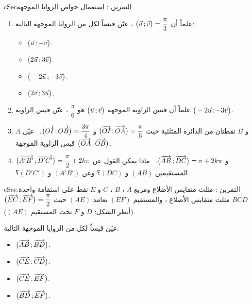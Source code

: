 \documentclass[12pt,a4paper]{article}
\newenvironment{BOX}[2]{\begin{otherlanguage}{english}\begin{arbox}{#1}{#2}}{\end{arbox}\end{otherlanguage}}
\newcounter{exo}
\newenvironment{tamrin}[1]{\stepcounter{exo}\begin{BOX}{cSec}{التمرين \theexo: #1}}{\end{BOX}}
\newenvironment{LTR}{\begin{otherlanguage}{english}}{\end{otherlanguage}}
\newenvironment{sq}{\begin{itemize}[leftmargin=2.4em,itemsep=3pt]}{\end{itemize}}
\newcommand{\qa}{\item[(أ)]}\newcommand{\qb}{\item[(ب)]}\newcommand{\qc}{\item[(جـ)]}\newcommand{\qd}{\item[(د)]}\newcommand{\qe}{\item[(هـ)]}
\begin{document}
\begin{tamrin}{استعمال خواص الزوايا الموجهة}
\begin{enumerate}
\item علماً أن $\big(\vec u\,;\vec v\big)=\dfrac{\pi}{3}$ ، عيّن قيساً لكل من الزوايا الموجهة التالية:
\begin{sq}
\qa $\big(\vec u\,;-\vec v\big)$.
\qb $\big(2\vec u\,;3\vec v\big)$.
\qc $\big(-2\vec u\,;-3\vec v\big)$.
\qd $\big(2\vec v\,;3\vec u\big)$.
\end{sq}
\item علماً أن قيس الزاوية الموجهة $\big(\vec u\,;\vec v\big)$ هو $\dfrac{\pi}{6}$ ، عيّن قيس الزاوية $\big(-2\vec u\,;-3\vec v\big)$.
\item $A$ و $B$ نقطتان من الدائرة المثلثية حيث $\big(\overrightarrow{OI}\,;\overrightarrow{OA}\big)=\dfrac{\pi}{6}$ و $\big(\overrightarrow{OI}\,;\overrightarrow{OB}\big)=\dfrac{3\pi}{4}$. \ عيّن قيس الزاوية الموجهة $\big(\overrightarrow{OA}\,;\overrightarrow{OB}\big)$.
\item $\big(\overrightarrow{A'B'}\,;\overrightarrow{D'C'}\big)=\dfrac{\pi}{2}+2k\pi$ و $\big(\overrightarrow{AB}\,;\overrightarrow{DC}\big)=\pi+2k\pi$. \ ماذا يمكن القول عن المستقيمين $(AB)$ و $(DC)$؟ وعن $(A'B')$ و $(D'C')$؟
\end{enumerate}
\end{tamrin}

\begin{tamrin}{مثلث متقايس الأضلاع ومربع}
$A$ ، $B$ ، $C$ و $E$ نقط على استقامة واحدة. $BCD$ مثلث متقايس الأضلاع ، والمستقيم $(EF)$ يعامد $(AE)$ حيث $\big(\overrightarrow{EC}\,;\overrightarrow{EF}\big)=\dfrac{\pi}{2}$ (أنظر الشكل: $D$ و $F$ تحت المستقيم $(AE)$).
\begin{center}\begin{LTR}
\end{LTR}\end{center}
عيّن قيساً لكل من الزوايا الموجهة التالية:
\begin{sq}
\qa $\big(\overrightarrow{AB}\,;\overrightarrow{BD}\big)$.
\qb $\big(\overrightarrow{CE}\,;\overrightarrow{CD}\big)$.
\qc $\big(\overrightarrow{CE}\,;\overrightarrow{EF}\big)$.
\qd $\big(\overrightarrow{BD}\,;\overrightarrow{EF}\big)$.
\end{sq}
\end{tamrin}
\end{document}
